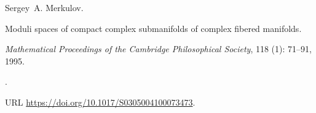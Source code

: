 Sergey~A. Merkulov.

\newblock Moduli spaces of compact complex submanifolds of complex fibered
  manifolds.

\newblock \emph{Mathematical Proceedings of the Cambridge Philosophical
  Society}, 118 (1): 71--91, 1995.

\newblock {}.

\newblock URL \url{https://doi.org/10.1017/S0305004100073473}.

